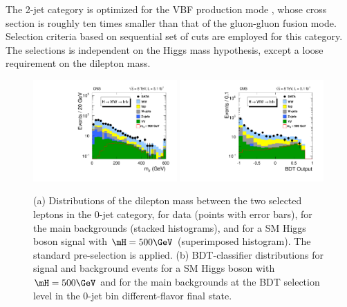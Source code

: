 
The 2-jet category is optimized for the VBF
production mode
\cite{Ciccolini:2007jr, Ciccolini:2007ec, Arnold:2008rz,Cahn:1987}, whose
cross section is roughly ten times smaller than that of the
gluon-gluon fusion mode. Selection criteria based on sequential set
of cuts are employed for
this category. The selections is independent on the Higgs mass
hypothesis, except a loose requirement on the dilepton mass.

\begin{figure}[htbp]
\centering
   \includegraphics[width=0.49\textwidth]{figures/WW2l2nuMass.pdf}
   \includegraphics[width=0.49\textwidth]{figures/WW2l2nuBDT.pdf}
   \caption{(a) Distributions of the dilepton mass between the
   two selected leptons in the 0-jet category, for data (points with
   error bars), for the main backgrounds (stacked histograms), and for
   a SM Higgs boson signal with $\mH= 500\GeV$ (superimposed
   histogram). The standard pre-selection is applied.  (b) BDT-classifier
   distributions for signal and background events for a SM
   Higgs boson with $\mH=500\GeV$ and for the main backgrounds at the
   BDT selection level in the 0-jet bin different-flavor final state.}
\label{fig:hww2l2n_bdt_500}
\end{figure}

